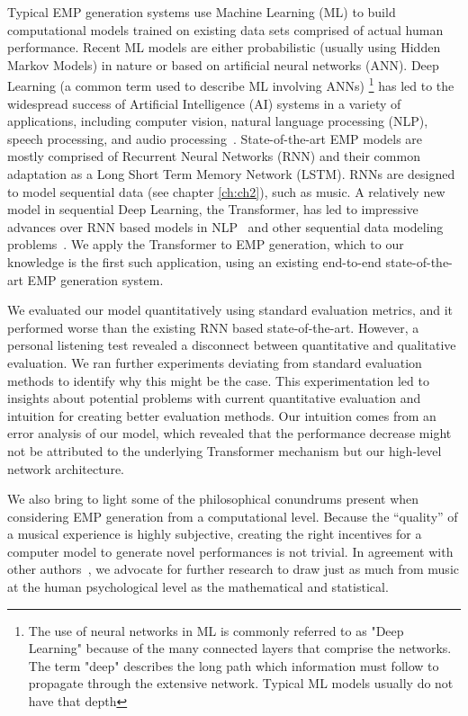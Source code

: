 Typical EMP generation systems use Machine Learning (ML) to build computational models trained on existing data sets comprised of actual human performance. Recent ML models are either probabilistic (usually using Hidden Markov Models) in nature or based on artificial neural networks (ANN). Deep Learning (a common term used to describe ML involving ANNs)%
\footnote{The use of neural networks in ML is commonly referred to as "Deep Learning" because of the many connected layers that comprise the networks. The term "deep" describes the long path which information must follow to propagate through the extensive network. Typical ML models usually do not have that depth} has led to the widespread success of Artificial Intelligence (AI) systems in a variety of applications, including computer vision, natural language processing (NLP), speech processing, and audio processing~\cite{goodfellow2016deep}. State-of-the-art EMP models are mostly comprised of Recurrent Neural Networks (RNN) and their common adaptation as a Long Short Term Memory Network (LSTM). RNNs are designed to model sequential data (see chapter \ref{ch:ch2}), such as music. A relatively new model in sequential Deep Learning, the Transformer, has led to impressive advances over RNN based models in NLP~\cite{devlin2018bert,brown2020language} and other sequential data modeling problems~\cite{dosovitskiy2020image}. We apply the Transformer to EMP generation, which to our knowledge is the first such application, using an existing end-to-end state-of-the-art EMP generation system. 

We evaluated our model quantitatively using standard evaluation metrics, and it performed worse than the existing RNN based state-of-the-art. However, a personal listening test revealed a disconnect between quantitative and qualitative evaluation. We ran further experiments deviating from standard evaluation methods to identify why this might be the case. This experimentation led to insights about potential problems with current quantitative evaluation and intuition for creating better evaluation methods. Our intuition comes from an error analysis of our model, which revealed that the performance decrease might not be attributed to the underlying Transformer mechanism but our high-level network architecture. 

We also bring to light some of the philosophical conundrums present when considering EMP generation from a computational level. Because the ``quality'' of a musical experience is highly subjective, creating the right incentives for a computer model to generate novel performances is not trivial. In agreement with other authors~\cite{widmer2016getting}, we advocate for further research to draw just as much from music at the human psychological level as the mathematical and statistical. 